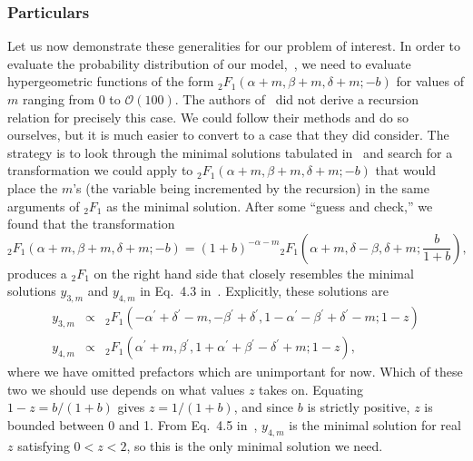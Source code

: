\subsubsection{Particulars}
Let us now demonstrate these generalities for our problem of interest.
In order to evaluate the probability distribution of our
model,~, we need to evaluate hypergeometric functions
of the form ${_2F_1}(\alpha+m, \beta+m, \delta+m; -b)$
for values of $m$ ranging from $0$ to $\mathcal{O}(100)$.
The authors of~\cite{Gil2007} did not derive a recursion relation
for precisely this case. We could follow their methods and do so ourselves,
but it is much easier to convert to a case that they did consider.
The strategy is to look through the minimal solutions tabulated
in~\cite{Gil2007} and search for a transformation we could apply to
${_2F_1}(\alpha+m, \beta+m, \delta+m; -b)$ that would place the $m$'s
(the variable being incremented by the recursion)
in the same arguments of ${_2F_1}$ as the minimal solution.
After some ``guess and check,'' we found that the transformation
\begin{equation}
{_2F_1}(\alpha+m, \beta+m, \delta+m; -b)
=
(1+b)^{-\alpha-m}
        {_2F_1}\left(\alpha+m, \delta-\beta, \delta+m; \frac{b}{1+b}\right),
\label{eq:rec_euler_pretransform}
\end{equation}
produces a ${_2F_1}$ on the right hand side that closely resembles
the minimal solutions $y_{3,m}$ and $y_{4,m}$ in Eq.~4.3 in~\cite{Gil2007}.
Explicitly, these solutions are
\begin{eqnarray}
y_{3,m}
&\propto&
{_2F_1}\left(-\alpha^\prime + \delta^\prime - m,
                -\beta^\prime + \delta^\prime,
                1-\alpha^\prime-\beta^\prime+\delta^\prime-m;
                1-z\right)
\\
y_{4,m}
&\propto&
{_2F_1}\left(\alpha^\prime + m,
                \beta^\prime,
                1+\alpha^\prime+\beta^\prime-\delta^\prime+m;
                1-z\right),
\label{eq:minimal_soln_sans_prefac}
\end{eqnarray}
where we have omitted prefactors which are unimportant for now.
Which of these two we should use depends on what values $z$ takes on.
Equating $1-z=b/(1+b)$ gives $z=1/(1+b)$, and since $b$ is strictly positive,
$z$ is bounded between 0 and 1.
From Eq.~4.5 in~\cite{Gil2007}, $y_{4,m}$ is the minimal solution
for real $z$ satisfying $0<z<2$, so this is the only minimal solution we need.

